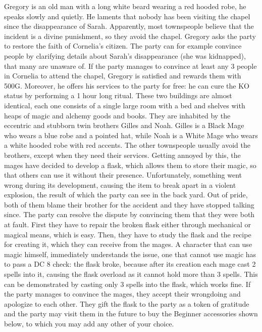 Gregory is an old man with a long white beard wearing a red hooded robe, he speaks slowly and quietly.
He laments that nobody has been visiting the chapel since the disappearance of Sarah.
Apparently, most townspeople believe that the incident is a divine punishment, so they avoid the chapel.
Gregory asks the party to restore the faith of Cornelia's citizen.
The party can for example convince people by clarifying details about Sarah's disappearance (she was kidnapped), that many are unaware of.
If the party manages to convince at least any 3 people in Cornelia to attend the chapel, Gregory is satisfied and rewards them with 500G.
Moreover, he offers his services to the party for free: he can cure the KO status by performing a 1 hour long ritual.
%
\clearpage
%
 These two buildings are almost identical, each one consists of a single large room with a bed and shelves with heaps of magic and alchemy goods and books.
They are inhabited by the eccentric and stubborn twin brothers Gilles and Noah. 
Gilles is a Black Mage who wears a blue robe and a pointed hat, while Noah is a White Mage who wears a white hooded robe with red accents.
The other townspeople usually avoid the brothers, except when they need their services.
Getting annoyed by this, the mages have decided to develop a flask, which allows them to store their magic, so that others can use it without their presence.
Unfortunately, something went wrong during its development, causing the item to break apart in a violent explosion, the result of which the party can see in the back yard.
Out of pride, both of them blame their brother for the accident and they have stopped talking since.
The party can resolve the dispute by convincing them that they were both at fault.
First they have to repair the broken flask either through mechanical or magical means, which is easy.
Then, they have to study the flask and the recipe for creating it, which they can receive from the mages.
A character that can use magic himself, immediately understands the issue, one that cannot use magic has to pass a DC 8 check:
the flask broke, because after its creation each mage cast 2 spells into it, causing the flask overload as it cannot hold more than 3 spells.
This can be demonstrated by casting only 3 spells into the flask, which works fine.
If the party manages to convince the mages, they accept their wrongdoing and apologize to each other.
They gift the flask to the party as a token of gratitude and the party may visit them in the future to buy the Beginner accessories shown below, to which you may add any other of your choice.
